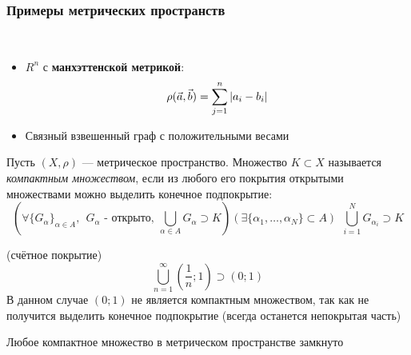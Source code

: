 \subsubsection*{Примеры метрических пространств}

\begin{example}~
\begin{itemize}
	\item $R^n$ с \textbf{манхэттенской метрикой}:
	\[
		\rho(\vec{a}, \vec{b}) = \sum\limits_{j = 1}^n |a_i - b_i|
	\]
	
	\item Связный взвешенный граф с положительными весами
\end{itemize}
\end{example}

\begin{definition} Пусть $(X, \rho)$ ---
	метрическое пространство. Множество $K \subset X$ называется
	\textit{компактным множеством}, если из любого его
	покрытия открытыми множествами можно
	выделить конечное подпокрытие:
	\[	
		\left(\forall \{G_\alpha\}_{\alpha \in A},\ \ G_\alpha
		\text{ - открыто},\ \bigcup_{\alpha \in A} G_\alpha
		\supset K \right)(\exists \{\alpha_1, \ldots, \alpha_N\}
		\subset A)\ \ \bigcup_{i = 1}^N G_{\alpha_i} \supset K
	\]
\end{definition}

\begin{example} (счётное покрытие)
	\[
		\bigcup_{n = 1}^\infty \left(\frac{1}{n}; 1\right)
		\supset (0; 1)
	\]
	В данном случае $(0; 1)$ не является компактным множеством, так
	как не получится выделить конечное подпокрытие (всегда останется
	непокрытая часть)
\end{example}

\begin{theorem}
	Любое компактное множество в метрическом пространстве замкнуто
\end{theorem}

